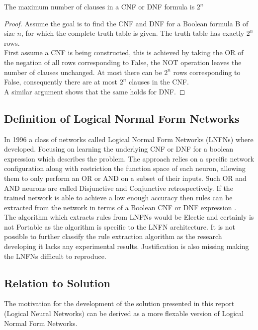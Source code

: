 \begin{theorem}
	The maximum number of clauses in a CNF or DNF formula is $2^n$
	\label{thm:max-clause-cnfdnf}
\end{theorem}

\begin{proof}
	Assume the goal is to find the CNF and DNF for a Boolean formula B of size $n$, for which the complete truth table is given. The truth table has exactly $2^n$ rows.\\
	
	First assume a CNF is being constructed, this is achieved by taking the OR of the negation of all rows corresponding to False, the NOT operation leaves the number of clauses unchanged. At most there can be $2^n$ rows corresponding to False, consequently there are at most $2^n$ clauses in the CNF.\\
	
	A similar argument shows that the same holds for DNF.
\end{proof}

\subsection{Definition of Logical Normal Form Networks}
In 1996 a class of networks called Logical Normal Form Networks \cite{herrmann1996backpropagation} (LNFNs) where developed. Focusing on learning the underlying CNF or DNF for a boolean expression which describes the problem. The approach relies on a specific network configuration along with restriction the function space of each neuron, allowing them to only perform an OR or AND on a subset of their inputs. Such OR and AND neurons are called Disjunctive and Conjunctive retrospectively. If the trained network is able to achieve a low enough accuracy then rules can be extracted from the network in terms of a Boolean CNF or DNF expression \cite{herrmann1996backpropagation}.\\

The algorithm which extracts rules from LNFNs would be Electic and certainly is not Portable as the algorithm is specific to the LNFN architecture. It is not possible to further classify the rule extraction algorithm as the research developing it lacks any experimental results. Justification is also missing making the LNFNs difficult to reproduce.\\

\subsection{Relation to Solution}
The motivation for the development of the solution presented in this report (Logical Neural Networks) can be derived as a more flexable version of Logical Normal Form Networks.

